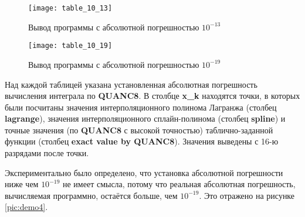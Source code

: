 \begin{figure}[H]
	\begin{center}
		\texttt{[image: table\_10\_13]}
		\caption{Вывод программы с абсолютной погрешностью $10^{-13}$} 
		\label{pic:demo2} %
	\end{center}
\end{figure}

\begin{figure}[H]
	\begin{center}
		\texttt{[image: table\_10\_19]}
		\caption{Вывод программы с абсолютной погрешностью $10^{-19}$} 
		\label{pic:demo3} %
	\end{center}
\end{figure} 
 
  Над каждой таблицей указана установленная абсолютная погрешность вычисления интеграла по \textbf{QUANC8}. В столбце \textbf{x\_k} находятся точки, в которых были посчитаны значения интерполяционного полинома Лагранжа (столбец \textbf{lagrange}), значения интерполяционного сплайн-полинома (столбец \textbf{spline}) и точные значения (по \textbf{QUANC8} с высокой точностью) таблично-заданной функции (столбец \textbf{exact value by QUANC8}). Значения выведены с 16-ю разрядами после точки. 
 
 Экспериментально было определено, что установка абсолютной погрешности ниже чем $10^{-19}$ не имеет смысла, потому что реальная абсолютная погрешность, вычисляемая программно, остаётся больше, чем $10^{-19}$. Это отражено на рисунке \ref{pic:demo4}.

